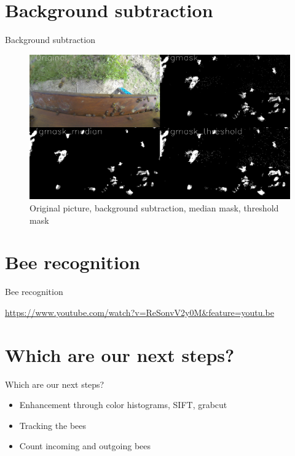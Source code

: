 \documentclass{beamer}
\begin{document}
\section{Background subtraction}
\begin{frame}{Background subtraction}
\begin{figure}
\includegraphics[scale=0.23]{pictures/backg2}
\caption{Original picture, background subtraction, median mask, threshold mask}
\end{figure}
\end{frame}

\section{Bee recognition}
\begin{frame}{Bee recognition}

\centering 
\url{https://www.youtube.com/watch?v=ReSonvV2y0M&feature=youtu.be}
\end{frame}

\section{Which are our next steps?}
\begin{frame}{Which are our next steps?}
\begin{itemize}
\item Enhancement through color histograms, SIFT, grabcut
\item Tracking the bees
\item Count incoming and outgoing bees
\end{itemize}
\end{frame}
\end{document}
